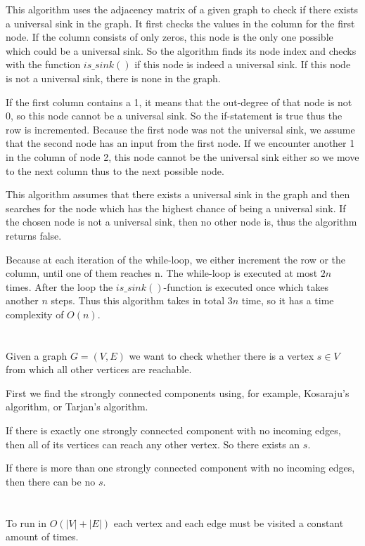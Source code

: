 \documentclass[12pt]{article}
\begin{document}
This algorithm uses the adjacency matrix of a given graph to check if there exists a universal sink in the graph.
It first checks the values in the column for the first node.
If the column consists of only zeros, this node is the only one possible which could be a universal sink.
So the algorithm finds its node index and checks with the function $is\_sink()$ if this node is indeed a universal sink.
If this node is not a universal sink, there is none in the graph.

If the first column contains a 1, it means that the out-degree of that node is not 0, so this node cannot be a universal sink.
So the if-statement is true thus the row is incremented.
Because the first node was not the universal sink, we assume that the second node has an input from the first node.
If we encounter another 1 in the column of node 2, this node cannot be the universal sink either so we move to the next column thus to the next possible node.

This algorithm assumes that there exists a universal sink in the graph and then searches for the node which has the highest chance of being a universal sink.
If the chosen node is not a universal sink, then no other node is, thus the algorithm returns false.

Because at each iteration of the while-loop, we either increment the row or the column, until one of them reaches n. The while-loop is executed at most $2n$ times.
After the loop the $is\_sink()$-function is executed once which takes another $n$ steps.
Thus this algorithm takes in total $3n$ time, so it has a time complexity of $O(n)$.

\section{} %
Given a graph $G = (V, E)$ we want to check whether there is a vertex $s \in V$ from which all other vertices are reachable.

First we find the strongly connected components using, for example, Kosaraju's algorithm, or Tarjan's algorithm.

If there is exactly one strongly connected component with no incoming edges, then all of its vertices can reach any other vertex. So there exists an $s$.

If there is more than one strongly connected component with no incoming edges, then there can be no $s$.

\section{} %
To run in $O(|V| + |E|)$ each vertex and each edge must be visited a constant amount of times.
\end{document}
